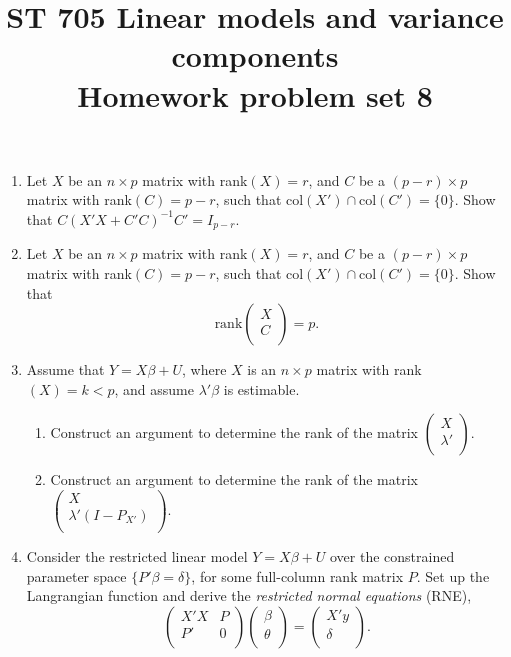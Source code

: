 \documentclass[11pt]{article}
\title{ST 705 Linear models and variance components \\ 
        Homework problem set 8}
\begin{document}
\maketitle

\begin{enumerate}

\item  Let $X$ be an $n\times p$ matrix with rank$(X) = r$, and $C$ be a $(p-r)\times p$ matrix with rank$(C) = p-r$, such that col$(X') \cap \text{col}(C') = \{0\}$.  Show that $C(X'X + C'C)^{-1}C' = I_{p-r}$.

\item Let $X$ be an $n\times p$ matrix with rank$(X) = r$, and $C$ be a $(p-r)\times p$ matrix with rank$(C) = p-r$, such that col$(X') \cap \text{col}(C') = \{0\}$.  Show that 
\[
\text{rank}
\begin{pmatrix}
X \\
C \\
\end{pmatrix} = p.
\]

\item Assume that $Y = X\beta + U$, where $X$ is an $n\times p$ matrix with rank$(X) = k < p$, and assume $\lambda'\beta$ is estimable.
\begin{enumerate}
\item Construct an argument to determine the rank of the matrix 
$
\begin{pmatrix}
X \\
\lambda' \\
\end{pmatrix}
$.
\item Construct an argument to determine the rank of the matrix  
$
\begin{pmatrix}
X \\
\lambda'(I - P_{X'}) \\
\end{pmatrix}
$.
\end{enumerate}

\item Consider the restricted linear model $Y = X\beta + U$ over the constrained parameter space $\{P'\beta = \delta\}$, for some full-column rank matrix $P$.  Set up the Langrangian function and derive the {\em restricted normal equations} (RNE),
\[
\begin{pmatrix}
X'X & P \\
P' & 0 \\
\end{pmatrix}
\begin{pmatrix}
\beta \\
\theta \\
\end{pmatrix} = 
\begin{pmatrix}
X'y \\
\delta \\
\end{pmatrix}.
\]


\end{enumerate}
\end{document}
